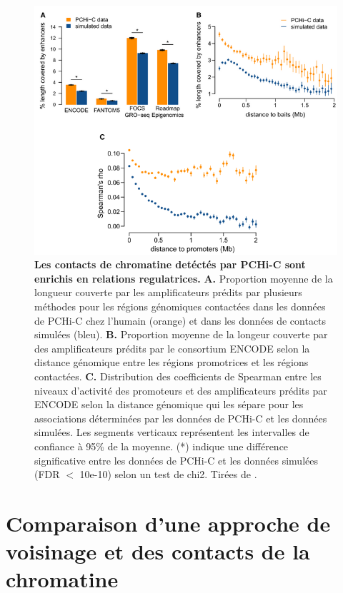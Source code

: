 \begin{figure}[H]
    \centering
    \includegraphics[width=1\textwidth, page=1] {figures/chap2/chap2-fig4.png}
    \caption[Les contacts de chromatine detéctés par \gls{PCHi-C} sont enrichis en relations regulatrices.]{
    \textbf{Les contacts de chromatine detéctés par \gls{PCHi-C} sont enrichis en relations regulatrices.}
    \textbf{A.} Proportion moyenne de la longueur couverte par les amplificateurs prédits par plusieurs méthodes pour les régions génomiques contactées dans les données de \gls{PCHi-C} chez l'humain (orange) et dans les données de contacts simulées (bleu). 
    \textbf{B.} Proportion moyenne de la longeur couverte par des amplificateurs prédits par le consortium ENCODE selon la distance génomique entre les régions promotrices et les régions contactées. 
    \textbf{C.} Distribution des coefficients de Spearman entre les niveaux d'activité des promoteurs et des amplificateurs prédits par ENCODE selon la distance génomique qui les sépare pour les associations déterminées par les données de \gls{PCHi-C} et les données simulées. Les segments verticaux représentent les intervalles de confiance à 95\% de la moyenne. (*) indique une différence significative entre les données de \gls{PCHi-C} et les données simulées (FDR $<$ 10e-10) selon un test de chi2.
    Tirées de \citep{laverre_long-range_2022}.
    }
    \label{fig:chap2-fig4}
\end{figure} 

\section{Comparaison d’une approche de voisinage et des contacts de la chromatine}
\label{sec:comp-voisinage-contact}

